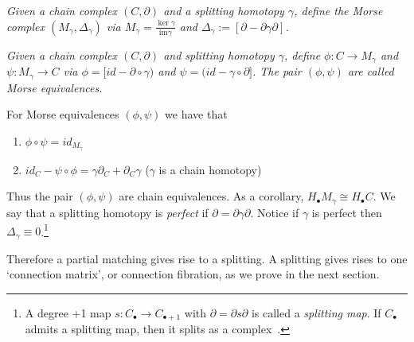 \begin{defn}
{\em
Given a chain complex $(C,\partial)$ and a splitting homotopy $\gamma$, define the {\em Morse complex} $(M_\gamma,\Delta_\gamma)$ via $M_\gamma=\frac{\ker \gamma}{\text{im} \gamma}$ and $\Delta_\gamma:= [\partial - \partial\gamma\partial]$. 
}
\end{defn}


\begin{defn}
{\em
Given a chain complex $(C,\partial)$ and splitting homotopy $\gamma$, define $\phi:C\to M_\gamma$ and $\psi:M_\gamma \to C$ via $\phi=[id - \partial \circ \gamma)$ and $\psi = (id - \gamma\circ \partial]$. The pair $(\phi,\psi)$ are called {\em Morse equivalences}.
}
\end{defn}

\begin{prop}\label{prop:MorseEquiv}
For Morse equivalences $(\phi,\psi)$ we have that 
\begin{enumerate}
\item $\phi\circ \psi = id_{M_\gamma}$
\item $id_C - \psi\circ \phi = \gamma\partial_C + \partial_C \gamma$ ($\gamma$ is a chain homotopy)
\end{enumerate}

\end{prop}

Thus the pair $(\phi,\psi)$ are chain equivalences.  As a corollary, $H_\bullet M_\gamma\cong H_\bullet C$.  We say that a splitting homotopy is {\em perfect} if $\partial = \partial\gamma\partial$.  Notice if $\gamma$ is perfect then $\Delta_\gamma\equiv 0$.\footnote{A degree +1 map $s:C_\bullet \to C_{\bullet+1}$ with $\partial=\partial s\partial$ is called a {\em splitting map}. If $C_\bullet$ admits a splitting map, then it splits as a complex~\cite[Ex. 1.4.2]{weibel}.}


Therefore a partial matching gives rise to a splitting.  A splitting gives rises to one `connection matrix', or connection fibration, as we prove in the next section.





 